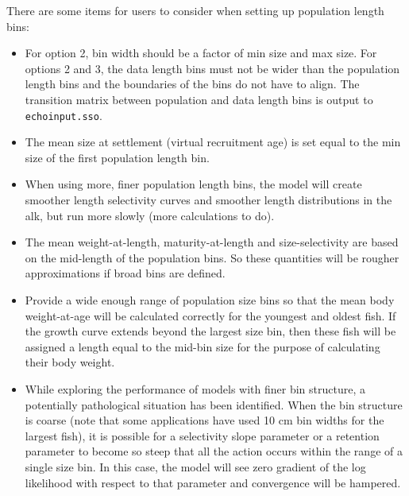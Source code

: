 There are some items for users to consider when setting up population length bins:
\begin{itemize}
	\item For option 2, bin width should be a factor of min size and max size. For options 2 and 3, the data length bins must not be wider than the population length bins and the boundaries of the bins do not have to align. The transition matrix between population and data length bins is output to \texttt{echoinput.sso}.
	
	\item The mean size at settlement (virtual recruitment age) is set equal to the min size of the first population length bin.
	
	\item When using more, finer population length bins, the model will create smoother length selectivity curves and smoother length distributions in the \gls{alk}, but run more slowly (more calculations to do).
	
	\item The mean weight-at-length, maturity-at-length and size-selectivity are based on the mid-length of the population bins. So these quantities will be rougher approximations if broad bins are defined.
	
	\item Provide a wide enough range of population size bins so that the mean body weight-at-age will be calculated correctly for the youngest and oldest fish. If the growth curve extends beyond the largest size bin, then these fish will be assigned a length equal to the mid-bin size for the purpose of calculating their body weight.
	
	\item While exploring the performance of models with finer bin structure, a potentially pathological situation has been identified. When the bin structure is coarse (note that some applications have used 10 cm bin widths for the largest fish), it is possible for a selectivity slope parameter or a retention parameter to become so steep that all the action occurs within the range of a single size bin. In this case, the model will see zero gradient of the log likelihood with respect to that parameter and convergence will be hampered.
	

\end{itemize}
